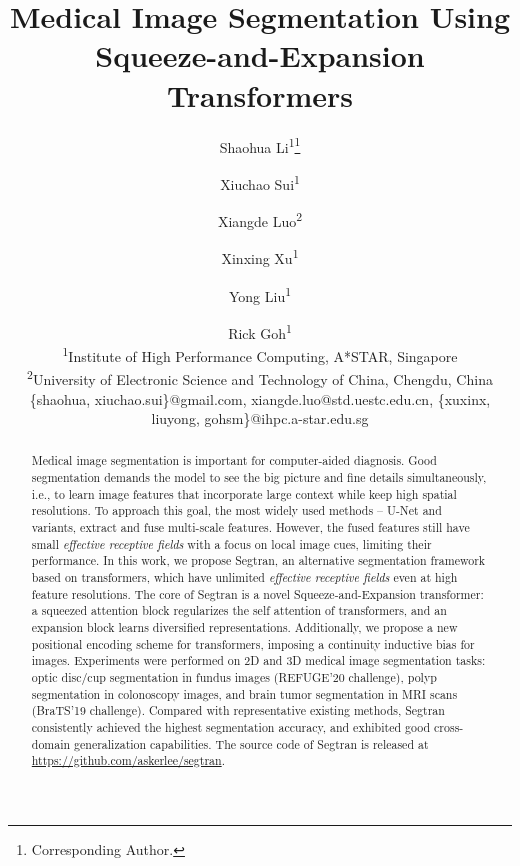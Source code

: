 \documentclass{article}
\begin{document}
\title{Medical Image Segmentation Using Squeeze-and-Expansion Transformers}
\author{Shaohua Li\textsuperscript{1}\footnote{Corresponding Author.} \and Xiuchao Sui\textsuperscript{1} \and  Xiangde Luo\textsuperscript{2} \and  Xinxing Xu\textsuperscript{1} \and Yong Liu\textsuperscript{1} \and  Rick Goh\textsuperscript{1} \\
\affiliations
\textsuperscript{1}Institute of High Performance Computing, A*STAR, Singapore\\
\textsuperscript{2}University of Electronic Science and Technology of China, Chengdu, China \\
\emails
\{shaohua, xiuchao.sui\}@gmail.com, xiangde.luo@std.uestc.edu.cn,
\{xuxinx, liuyong, gohsm\}@ihpc.a-star.edu.sg
}


\maketitle
\begin{abstract}
Medical image segmentation is important for computer-aided diagnosis. Good segmentation demands the model to see the big picture and fine details simultaneously, i.e., to learn image features that incorporate large context while keep high spatial resolutions. To approach this goal, the most widely used methods -- U-Net and variants, extract and fuse multi-scale features. However, the fused features still have small \emph{effective receptive fields} with a focus on local image cues, limiting their performance. In this work, we propose Segtran, an alternative segmentation framework based on transformers, which have unlimited \emph{effective receptive fields} even at high feature resolutions. The core of Segtran is a novel Squeeze-and-Expansion transformer: a squeezed attention block regularizes the self attention of transformers, and an expansion block learns diversified representations. Additionally, we propose a new positional encoding scheme for transformers, imposing a continuity inductive bias for images. Experiments were performed on 2D and 3D medical image segmentation tasks: optic disc/cup segmentation in fundus images (REFUGE'20 challenge), polyp segmentation in colonoscopy images, and brain tumor segmentation in MRI scans (BraTS'19 challenge). Compared with representative existing methods, Segtran consistently achieved the highest segmentation accuracy, and exhibited good cross-domain generalization capabilities. The source code of Segtran is released at \url{https://github.com/askerlee/segtran}.
\end{abstract}
\end{document}
